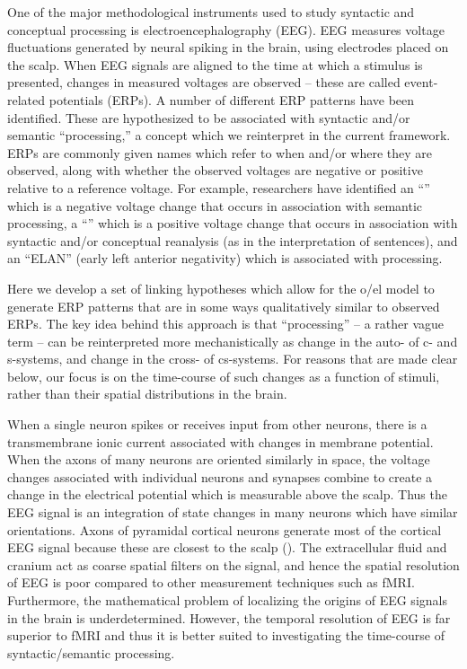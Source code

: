 One of the major methodological instruments used to study syntactic and conceptual processing is electroencephalography (EEG). EEG measures voltage fluctuations generated by neural spiking in the brain, using electrodes placed on the scalp. When EEG signals are aligned to the time at which a stimulus is presented, changes in measured voltages are observed -- these are called event-related potentials (ERPs). A number of different ERP patterns have been identified. These are hypothesized to be associated with syntactic and/or semantic “processing,” a concept which we reinterpret in the current framework. ERPs are commonly given names which refer to when and/or where they are observed, along with whether the observed voltages are negative or positive relative to a reference voltage. For example, researchers have identified an “” which is a negative voltage change that occurs in association with semantic processing, a “” which is a positive voltage change that occurs in association with syntactic and/or conceptual reanalysis (as in the interpretation of  sentences), and an “ELAN” (early left anterior negativity) which is associated with  processing. 

Here we develop a set of linking hypotheses which allow for the o/el model to generate ERP patterns that are in some ways qualitatively similar to observed ERPs. The key idea behind this approach is that “processing” -- a rather vague term -- can be reinterpreted more mechanistically as change in the auto- of c- and s-sys\-tems, and change in the cross- of cs-sys\-tems. For reasons that are made clear below, our focus is on the time-course of such changes as a function of stimuli, rather than their spatial distributions in the brain.

When a single neuron spikes or receives input from other neurons, there is a transmembrane ionic current associated with changes in membrane potential. When the axons of many neurons are oriented similarly in space, the voltage changes associated with individual neurons and synapses combine to create a change in the electrical potential which is measurable above the scalp. Thus the EEG signal is an integration of state changes in many neurons which have similar orientations. Axons of pyramidal cortical neurons generate most of the cortical EEG signal because these are closest to the scalp (\citealt{FedermeierLaszlo2009,KutasDale1997}). The extracellular fluid and cranium act as coarse spatial filters on the signal, and hence the spatial resolution of EEG is poor compared to other measurement techniques such as fMRI. Furthermore, the mathematical problem of localizing the origins of EEG signals in the brain is underdetermined. However, the temporal resolution of EEG is far superior to fMRI and thus it is better suited to investigating the time-course of syntactic/semantic processing. 

